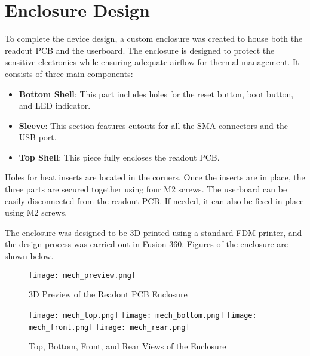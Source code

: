 \chapter{Enclosure Design}
To complete the device design, a custom enclosure was created to house both the readout PCB and the userboard. The enclosure is designed to protect the sensitive electronics while ensuring adequate airflow for thermal management. It consists of three main components: 

\begin{itemize}
    \item \textbf{Bottom Shell}: This part includes holes for the reset button, boot button, and LED indicator.
    \item \textbf{Sleeve}: This section features cutouts for all the SMA connectors and the USB port.
    \item \textbf{Top Shell}: This piece fully encloses the readout PCB.
\end{itemize}

Holes for heat inserts are located in the corners. Once the inserts are in place, the three parts are secured together using four M2 screws. The userboard can be easily disconnected from the readout PCB. If needed, it can also be fixed in place using M2 screws. 

The enclosure was designed to be 3D printed using a standard FDM printer, and the design process was carried out in Fusion 360. Figures of the enclosure are shown below.

\FloatBarrier
\begin{figure}[htp!]
    \centering
    \texttt{[image: mech\_preview.png]}
    \caption{3D Preview of the Readout PCB Enclosure}
    \label{fig:readout_3d_preview}
\end{figure}
\FloatBarrier

\FloatBarrier
\begin{figure}[htp!]
    \centering
    \texttt{[image: mech\_top.png]}
    \texttt{[image: mech\_bottom.png]}
    \texttt{[image: mech\_front.png]}
    \texttt{[image: mech\_rear.png]}
    \caption{Top, Bottom, Front, and Rear Views of the Enclosure}
    \label{fig:readout_3d_views}
\end{figure}
\FloatBarrier
